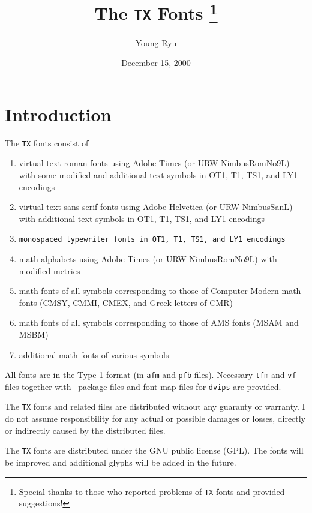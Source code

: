 \documentclass[11pt]{article}
\begin{document}
\title{The \texttt{TX} Fonts%
\thanks{Special thanks to those who reported problems of
\texttt{TX} fonts and provided suggestions!}}

\author{Young Ryu}

\date{December 15, 2000}

\maketitle

\tableofcontents

\clearpage
\section{Introduction}

The \texttt{TX} fonts consist of
\begin{enumerate}\itemsep=0pt
\item virtual text roman fonts using Adobe Times (or URW NimbusRomNo9L) with
      some modified and additional text symbols in OT1, T1, TS1, and LY1 encodings
\item \textsf{virtual text sans serif fonts using Adobe Helvetica (or URW NimbusSanL) with
      additional text symbols in OT1, T1, TS1, and LY1 encodings}
\item \texttt{monospaced typewriter fonts in OT1, T1, TS1, and LY1 encodings}
\item math alphabets using Adobe Times (or URW NimbusRomNo9L)
      with modified metrics
\item math fonts of all symbols corresponding to those of Computer Modern
      math fonts (CMSY, CMMI, CMEX, and Greek letters of CMR)
\item math fonts of all symbols corresponding to those of AMS fonts
      (MSAM and MSBM)
\item additional math fonts of various symbols
\end{enumerate}
%
All fonts are in the Type 1 format (in \texttt{afm} and \texttt{pfb} files).
Necessary \texttt{tfm} and \texttt{vf} files together with
\LaTeXe\ package files and font map files for \texttt{dvips} are
provided.

\begin{bfseries}%
The \texttt{TX} fonts and related files are distributed 
without any guaranty or warranty.
I do not assume responsibility for any actual or possible
damages or losses, directly or indirectly caused by the
distributed files.
\end{bfseries}
The \texttt{TX} fonts are distributed under the GNU public license (GPL)\@.
The fonts will be improved and additional glyphs will be added
in the future.
\end{document}
